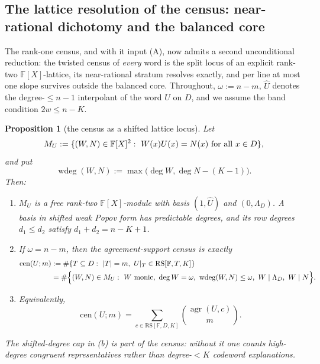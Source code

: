 \documentclass[11pt]{article}
\newtheorem{proposition}[proposition]{Proposition}
\theoremstyle{definition}
\theoremstyle{remark}
\newcommand{\F}{\mathbb{F}}
\newcommand{\RS}{\mathrm{RS}}
\begin{document}
\subsection{The lattice resolution of the census: near-rational dichotomy and the balanced core}

The rank-one census, and with it input \textup{(A)}, now admits a second unconditional reduction: the twisted census of \emph{every} word is the split locus of an explicit rank-two $\F[X]$-lattice, its near-rational stratum resolves exactly, and per line at most one slope survives outside the balanced core.  Throughout, $\omega:=n-m$, $\widehat U$ denotes the degree-$\le n-1$ interpolant of the word $U$ on $D$, and we assume the band condition $2w\le n-K$.


\begin{proposition}[the census as a shifted lattice locus]\label{prop:capfp-lattice}
Let
\[
        M_U:=\{(W,N)\in\F[X]^2:\ W(x)U(x)=N(x)\ \textup{for all }x\in D\},
\]
and put
\[
        \operatorname{wdeg}(W,N):=\max\bigl(\deg W,\deg N-(K-1)\bigr).
\]
Then:
\begin{enumerate}[label=\textup{(\alph*)}]
\item $M_U$ is a free rank-two $\F[X]$-module with basis
$(1,\widehat U)$ and $(0,\Lambda_D)$.  A basis in shifted weak Popov
form has predictable degrees, and its row degrees $d_1\le d_2$ satisfy
$d_1+d_2=n-K+1$.
\item If $\omega=n-m$, then the agreement-support census is exactly
\[
\begin{aligned}
\mathrm{cen}(U;m)
&:=\#\{T\subseteq D:\ |T|=m,\ U|_T\in \RS[\F,T,K]\}\\
&=\#\Bigl\{(W,N)\in M_U:\
        W\textup{ monic},\ \deg W=\omega,\
        \operatorname{wdeg}(W,N)\le\omega,\
        W\mid\Lambda_D,\ W\mid N
        \Bigr\}.
\end{aligned}
\]
\item Equivalently,
\[
        \mathrm{cen}(U;m)=\sum_{c\in \RS[\F,D,K]}\binom{\operatorname{agr}(U,c)}m.
\]
\end{enumerate}
The shifted-degree cap in \textup{(b)} is part of the census: without it one
counts high-degree congruent representatives rather than degree-$<K$ codeword
explanations.
\end{proposition}
\end{document}
